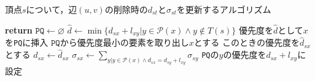 \begin{algorithm}[tb]
  \caption{頂点$s$について，辺$(u,v)$の削除時の$d_{st}$と$\sigma_{st}$を更新するアルゴリズム}
  \label{alg:decremental-algorithm}
  \begin{algorithmic}[1]\small
    \State \textbf{return}
    \EndIf
    \State $\texttt{PQ}\gets\varnothing$
    \State $\hat{d}\gets\min\{d_{sx}+l_{xy}|y\in\mathcal{P}(x)\land y\notin T(s)\}$
    \State 優先度を$\hat{d}$として$x$を\texttt{PQ}に挿入
    \EndIf
    \EndFor
    \State $\texttt{PQ}$から優先度最小の要素を取り出し$x$とする
    \State このときの優先度を$\hat{d}_{sx}$とする
    \State $d_{sx}\gets\hat{d}_{sx}$
    \State $\sigma_{sx}\gets\sum_{y|y\in\mathcal{P}(x)\land d_{sx}=d_{sy}+l_{xy}}\sigma_{sy}$
    \State \texttt{PQ}の$y$の優先度を$d_{sx}+l_{xy}$に設定
    \EndIf
    \EndFor
    \EndWhile
    \EndProcedure
  \end{algorithmic}
\end{algorithm}
